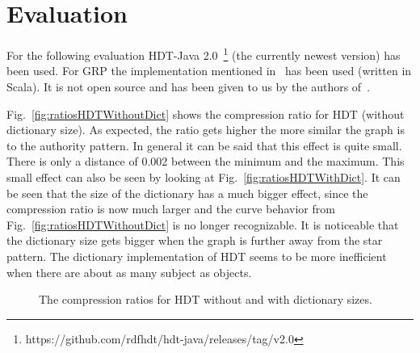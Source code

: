\section{Evaluation}\label{sec:evalHDT}

For the following evaluation HDT-Java 2.0~\footnote{\label{foot:1}https://github.com/rdfhdt/hdt-java/releases/tag/v2.0} (the currently newest version) has been used. For GRP the implementation mentioned in~\cite{maneth} has been used (written in Scala). It is not open source and has been given to us by the authors of~\cite{maneth}.

Fig.~\ref{fig:ratiosHDTWithoutDict} shows the compression ratio for HDT (without dictionary size). As expected, the ratio gets higher the more similar the graph is to the authority pattern. In general it can be said that this effect is quite small. There is only a distance of 0.002 between the minimum and the maximum. This small effect can also be seen by looking at Fig.~\ref{fig:ratiosHDTWithDict}. It can be seen that the size of the dictionary has a much bigger effect, since the compression ratio is now much larger and the curve behavior from Fig.~\ref{fig:ratiosHDTWithoutDict} is no longer recognizable. It is noticeable that the dictionary size gets bigger when the graph is further away from the star pattern. The dictionary implementation of HDT seems to be more inefficient when there are about as many subject as objects. 


\begin{figure}[h]
	\centering
	\hfill
	\caption{The compression ratios for HDT without and with dictionary sizes.}
\end{figure}

